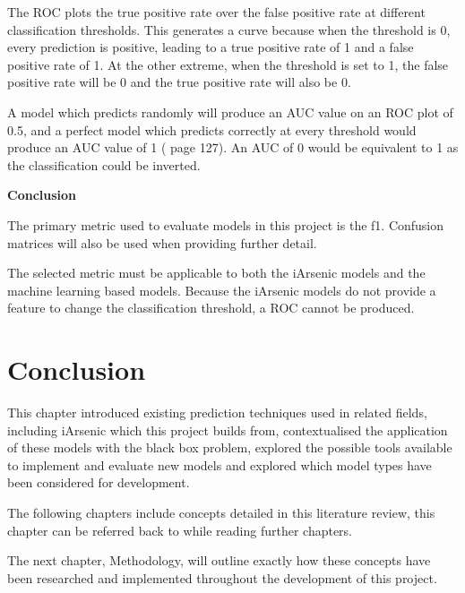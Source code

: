 The ROC plots the true positive rate over the false positive rate at different classification thresholds. This generates a curve because when the threshold is 0, every prediction is positive, leading to a true positive rate of 1 and a false positive rate of 1. At the other extreme, when the threshold is set to 1, the false positive rate will be 0 and the true positive rate will also be 0.

A model which predicts randomly will produce an AUC value on an ROC plot of 0.5, and a perfect model which predicts correctly at every threshold would produce an AUC value of 1 (\cite{Aurélien2017} page 127). An AUC of 0 would be equivalent to 1 as the classification could be inverted.

\textbf{Conclusion}

The primary metric used to evaluate models in this project is the f1. Confusion matrices will also be used when providing further detail.

The selected metric must be applicable to both the iArsenic models and the machine learning based models. Because the iArsenic models do not provide a feature to change the classification threshold, a ROC cannot be produced. 

\section{Conclusion}

This chapter introduced existing prediction techniques used in related fields, including iArsenic which this project builds from, contextualised the application of these models with the black box problem, explored the possible tools available to implement and evaluate new models and explored which model types have been considered for development.

The following chapters include concepts detailed in this literature review, this chapter can be referred back to while reading further chapters.

The next chapter, Methodology, will outline exactly how these concepts have been researched and implemented throughout the development of this project. 